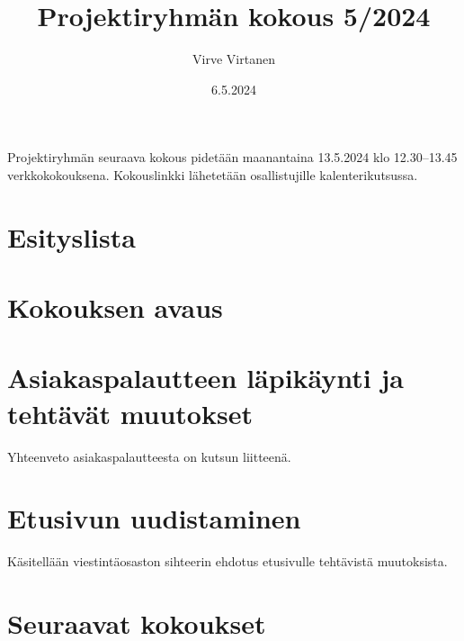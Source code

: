 \documentclass[agenda]{sfs-2487-2024}
\date{6.5.2024}
\author{Virve Virtanen}
\title{Projektiryhmän kokous 5/2024}
\begin{document}
\maketitle

Projektiryhmän seuraava kokous pidetään maanantaina 13.5.2024
klo 12.30--13.45 verkkokokouksena. Kokouslinkki lähetetään
osallistujille kalenterikutsussa.

\section*{Esityslista}

\section{Kokouksen avaus}

\section{Asiakaspalautteen läpikäynti ja tehtävät muutokset}

Yhteenveto asiakaspalautteesta on kutsun liitteenä.

\section{Etusivun uudistaminen}

Käsitellään viestintäosaston sihteerin ehdotus etusivulle
tehtävistä muutoksista.

\section{Seuraavat kokoukset}




\makecontactinfo
\end{document}
